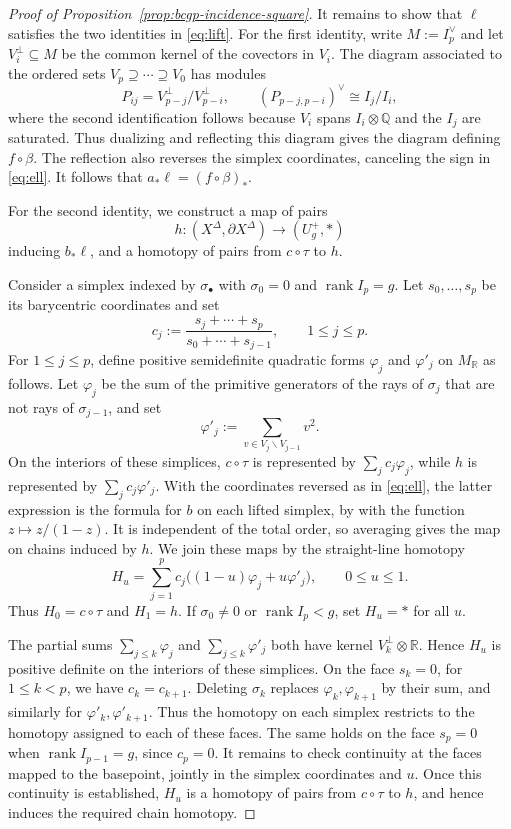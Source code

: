 \documentclass[12 pt]{amsart}
\newcommand{\QQ}{\mathbb{Q}}
\newcommand{\RR}{\mathbb{R}}
\newcommand{\rank}{\operatorname{rank}}
\newcommand{\<}{\langle}
\renewcommand{\>}{\rangle}
\theoremstyle{definition}
\begin{document}
\begin{proof}[Proof of Proposition~\ref{prop:bcgp-incidence-square}]
It remains to show that $\ell$ satisfies the two identities in \eqref{eq:lift}. For the first identity, write $M := I_p^\vee$ and let $V_i^\perp \subseteq M$ be the common kernel of the covectors in $V_i$. The diagram associated to the ordered sets $V_p \supseteq \cdots \supseteq V_0$ has modules
\[
P_{ij} = V_{p - j}^\perp/V_{p - i}^\perp, \qquad (P_{p - j, p - i})^\vee \cong I_j/I_i,
\]
where the second identification follows because $V_i$ spans $I_i \otimes \QQ$ and the $I_j$ are saturated. Thus dualizing and reflecting this diagram gives the diagram defining $f \circ \beta$. The reflection also reverses the simplex coordinates, canceling the sign in \eqref{eq:ell}. It follows that $a_* \ell = (f \circ \beta)_*$.

For the second identity, we construct a map of pairs
\[
h \colon (X^\Delta, \partial X^\Delta) \longrightarrow (U_g^+, *)
\]
inducing $b_* \ell$, and a homotopy of pairs from $c \circ \tau$ to $h$.

Consider a simplex indexed by $\sigma_\bullet$ with $\sigma_0 = 0$ and $\rank I_p = g$. Let $s_0, \ldots, s_p$ be its barycentric coordinates and set
\[
c_j := \frac{s_j + \cdots + s_p}{s_0 + \cdots + s_{j - 1}}, \qquad 1 \leq j \leq p.
\]
For $1 \leq j \leq p$, define positive semidefinite quadratic forms $\varphi_j$ and $\varphi'_j$ on $M_\RR$ as follows. Let $\varphi_j$ be the sum of the primitive generators of the rays of $\sigma_j$ that are not rays of $\sigma_{j - 1}$, and set
\[
\varphi'_j := \sum_{v \in V_j \smallsetminus V_{j - 1}} v^2.
\]
On the interiors of these simplices, $c \circ \tau$ is represented by $\sum_j c_j \varphi_j$, while $h$ is represented by $\sum_j c_j \varphi'_j$. With the coordinates reversed as in \eqref{eq:ell}, the latter expression is the formula for $b$ on each lifted simplex, by \cite[formula~(25)]{BCGP} with the function $z \mapsto z/(1 - z)$. It is independent of the total order, so averaging gives the map on chains induced by $h$. We join these maps by the straight-line homotopy
\[
H_u = \sum_{j = 1}^p c_j\bigl((1 - u) \varphi_j + u \varphi'_j\bigr), \qquad 0 \leq u \leq 1.
\]
Thus $H_0 = c \circ \tau$ and $H_1 = h$. If $\sigma_0 \neq 0$ or $\rank I_p < g$, set $H_u = *$ for all $u$.

The partial sums $\sum_{j \leq k} \varphi_j$ and $\sum_{j \leq k} \varphi'_j$ both have kernel $V_k^\perp \otimes \RR$. Hence $H_u$ is positive definite on the interiors of these simplices. On the face $s_k = 0$, for $1 \leq k < p$, we have $c_k = c_{k + 1}$. Deleting $\sigma_k$ replaces $\varphi_k, \varphi_{k + 1}$ by their sum, and similarly for $\varphi'_k, \varphi'_{k + 1}$. Thus the homotopy on each simplex restricts to the homotopy assigned to each of these faces. The same holds on the face $s_p = 0$ when $\rank I_{p - 1} = g$, since $c_p = 0$. It remains to check continuity at the faces mapped to the basepoint, jointly in the simplex coordinates and $u$. Once this continuity is established, $H_u$ is a homotopy of pairs from $c \circ \tau$ to $h$, and hence induces the required chain homotopy.


\end{proof}
\end{document}
